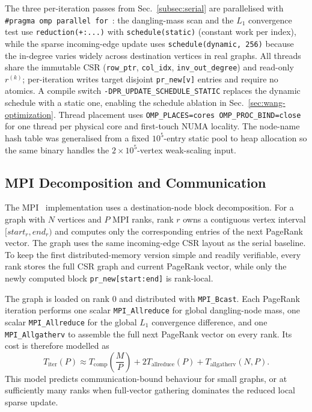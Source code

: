 \documentclass[11pt]{article}
\begin{document}
The three per-iteration passes from Sec.~\ref{subsec:serial} are
parallelised with \texttt{\#pragma omp parallel for}~\cite{openmp}: the
dangling-mass scan and the $L_1$ convergence test use
\texttt{reduction(+:...)} with \texttt{schedule(static)} (constant work
per index), while the sparse incoming-edge update uses
\texttt{schedule(dynamic, 256)} because the in-degree varies widely
across destination vertices in real graphs. All threads share the
immutable CSR (\texttt{row\_ptr}, \texttt{col\_idx},
\texttt{inv\_out\_degree}) and read-only $r^{(k)}$; per-iteration
writes target disjoint \texttt{pr\_new[v]} entries and require no
atomics. A compile switch \texttt{-DPR\_UPDATE\_SCHEDULE\_STATIC}
replaces the dynamic schedule with a static one, enabling the schedule
ablation in Sec.~\ref{sec:wang-optimization}. Thread placement uses
\texttt{OMP\_PLACES=cores OMP\_PROC\_BIND=close} for one thread per
physical core and first-touch NUMA locality. The node-name hash table was
generalised from a fixed $10^{5}$-entry static pool to heap allocation so
the same binary handles the $2{\times}10^{5}$-vertex weak-scaling input.

\subsection{MPI Decomposition and Communication}
\label{subsec:wang-mpi}

The MPI~\cite{mpi} implementation uses a destination-node block
decomposition. For a graph with $N$ vertices and $P$ MPI ranks, rank $r$
owns a contiguous vertex interval $[start_r,end_r)$ and computes only
the corresponding entries of the next PageRank vector. The graph uses
the same incoming-edge CSR layout as the serial baseline. To keep the
first distributed-memory version simple and readily verifiable, every
rank stores the full CSR graph and current PageRank vector, while only
the newly computed block \texttt{pr\_new[start:end]} is rank-local.

The graph is loaded on rank 0 and distributed with \texttt{MPI\_Bcast}.
Each PageRank iteration performs one scalar \texttt{MPI\_Allreduce} for
global dangling-node mass, one scalar \texttt{MPI\_Allreduce} for the
global $L_1$ convergence difference, and one \texttt{MPI\_Allgatherv}
to assemble the full next PageRank vector on every rank. Its cost is
therefore modelled as
\[
T_{\mathrm{iter}}(P) \approx T_{\mathrm{comp}}\left(\frac{M}{P}\right)
    + 2T_{\mathrm{allreduce}}(P)
    + T_{\mathrm{allgatherv}}(N,P).
\]
This model predicts communication-bound behaviour for small graphs, or
at sufficiently many ranks when full-vector gathering dominates the
reduced local sparse update.
\end{document}
